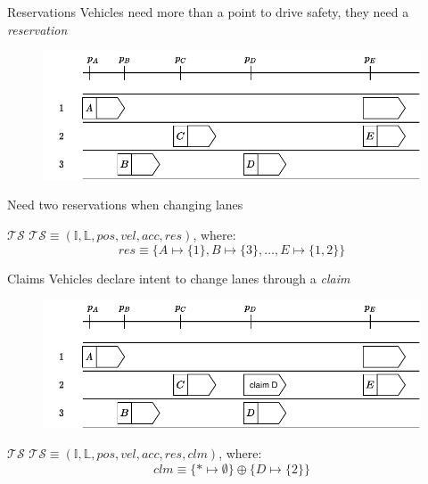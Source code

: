\documentclass[xcolor=table]{beamer}
\begin{document}
\begin{frame}{Reservations}
Vehicles need more than a point to drive safety, they need a \textit{reservation}
\begin{figure}[h]
	\centering
	\includegraphics[width=0.7 \textwidth]{../figs/MLSL_reservation}
\end{figure}

Need two reservations when changing lanes
\pause
\begin{block}{$\mathcal{TS}$}
	$\mathcal{TS} \equiv (\mathbb{I}, \mathbb{L}, pos, vel, acc, res)$, where:
	\begin{equation*}
	res \equiv \{A\mapsto \{1\}, B \mapsto{\{3\}}, \ldots, E \mapsto \{1, 2\}\}
	\end{equation*}
\end{block}

\end{frame}

\begin{frame}{Claims}
Vehicles declare intent to change lanes through a \textit{claim}
\begin{figure}[h]
	\centering
	\includegraphics[width=0.7 \textwidth]{../figs/MLSL_claim}
\end{figure}
\pause
\begin{block}{$\mathcal{TS}$}
	$\mathcal{TS} \equiv (\mathbb{I}, \mathbb{L}, pos, vel, acc, res, clm)$, where:
	\begin{equation*}
	clm \equiv \{ * \mapsto \emptyset \} \oplus \{D \mapsto \{2\}\}
	\end{equation*}
\end{block}
\end{frame}
\end{document}
